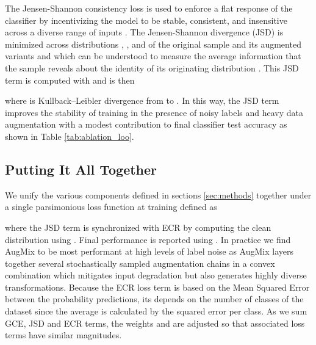 \documentclass{article}
\begin{document}
The Jensen-Shannon consistency loss is used to enforce a flat response of the classifier by incentivizing the model to be stable, consistent, and insensitive across a diverse range of inputs \cite{7780854}. The Jensen-Shannon divergence (JSD) is minimized across distributions , , and  of the original sample  and its augmented variants  and  which can be understood to measure the average information that the sample reveals about the identity of its originating distribution \cite{hendrycks2020augmix}.  This JSD term is computed with  and is then

where  is Kullback–Leibler divergence from  to .  In this way, the JSD term improves the stability of training in the presence of noisy labels and heavy data augmentation with a modest contribution to final classifier test accuracy as shown in Table \ref{tab:ablation_loo}. 


\subsection{Putting It All Together}
We unify the various components defined in sections \ref{sec:methods} together under a single parsimonious loss function at training defined as

where the JSD term is synchronized with ECR by computing the clean distribution using . Final performance is reported using .  In practice we find AugMix \cite{hendrycks2020augmix} to be most performant at high levels of label noise as AugMix layers together several stochastically sampled augmentation chains in a convex combination which mitigates input degradation but also generates highly diverse transformations.  Because the ECR loss term is based on the Mean Squared Error between the probability predictions, its depends on the number of classes of the dataset since the average is calculated by the squared error per class. As we sum GCE, JSD and ECR terms, the weights  and  are adjusted so that associated loss terms have similar magnitudes.
\end{document}
